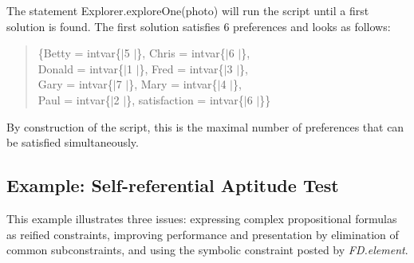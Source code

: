 \documentclass[a4paper]{scrartcl}
\begin{document}
The statement Explorer.exploreOne(photo) will run the script 
until a first solution is found. The first solution satisfies 
6 preferences and looks as follows:
\begin{quote}
\{Betty = intvar\{$|$5 $|$\}, 
 Chris = intvar\{$|$6 $|$\}, \\
 Donald = intvar\{$|$1 $|$\}, 
 Fred = intvar\{$|$3 $|$\}, \\
 Gary = intvar\{$|$7 $|$\}, 
 Mary = intvar\{$|$4 $|$\}, \\
 Paul = intvar\{$|$2 $|$\}, 
 satisfaction = intvar\{$|$6 $|$\}\}

\end{quote}
By construction of the script, this is the maximal number of 
preferences that can be satisfied simultaneously. 


\newpage
\subsection{Example: Self-referential Aptitude Test}
This example illustrates three issues: expressing complex 
propositional formulas as reified constraints, improving 
performance and presentation by elimination of common subconstraints, 
and using the symbolic constraint posted by {\it FD.element}.
\end{document}
